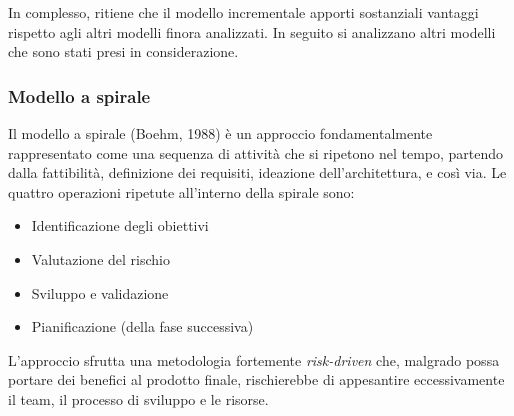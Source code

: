 In complesso, \hx{} ritiene che il modello incrementale apporti sostanziali vantaggi rispetto agli altri modelli finora analizzati. In seguito si analizzano altri modelli che sono stati presi in considerazione.

\subsubsection{Modello a spirale}
Il modello a spirale (Boehm, 1988) è un approccio fondamentalmente rappresentato come una sequenza di attività che si ripetono nel tempo, partendo dalla fattibilità, definizione dei requisiti, ideazione dell'architettura, e così via. Le quattro operazioni ripetute all'interno della spirale sono:
\begin{itemize}
	\item Identificazione degli obiettivi
	\item Valutazione del rischio
	\item Sviluppo e validazione
	\item Pianificazione (della fase successiva)
\end{itemize}			 

L'approccio sfrutta una metodologia fortemente \emph{risk-driven} che, malgrado possa portare dei benefici al prodotto finale, rischierebbe di appesantire eccessivamente il team, il processo di sviluppo e le risorse.




